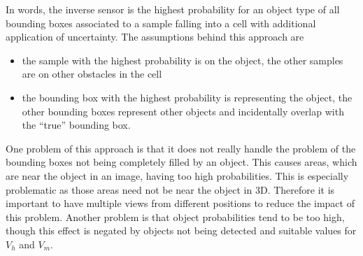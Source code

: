 In words, the inverse sensor is the highest probability for an object type of all bounding boxes associated to a sample falling into a cell with additional application of uncertainty. The assumptions behind this approach are 
\begin{itemize}
 \item the sample with the highest probability is on the object, the other samples are on other obstacles in the cell
 \item the bounding box with the highest probability is representing the object, the other bounding boxes represent other objects and incidentally overlap with the ``true'' bounding box.
\end{itemize}

One problem of this approach is that it does not really handle the problem of the bounding boxes not being completely filled by an object. This causes areas, which are near the object in an image, having too high probabilities. This is especially problematic as those areas need not be near the object in 3D. Therefore it is important to have multiple views from different positions to reduce the impact of this problem. Another problem is that object probabilities tend to be too high, though this effect is negated by objects not being detected and suitable values for $V_h$ and $V_m$. 